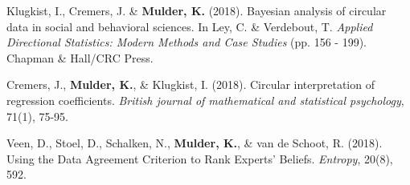 \documentclass[12pt, a4paper]{book}\usepackage[]{graphicx}\usepackage{xcolor}
\begin{document}
\vspace{.3cm}

\noindent Klugkist, I., Cremers, J. \& \textbf{Mulder, K.} (2018). Bayesian analysis of circular data in social and behavioral sciences. In Ley, C. \& Verdebout, T. \textit{Applied Directional Statistics: Modern Methods and Case Studies} (pp. 156 - 199). Chapman \& Hall/CRC Press.

\vspace{.3cm}

\noindent Cremers, J., \textbf{Mulder, K.}, \& Klugkist, I. (2018). Circular interpretation of regression coefficients. \textit{British journal of mathematical and statistical psychology}, 71(1), 75-95.

\vspace{.3cm}

\noindent Veen, D., Stoel, D., Schalken, N., \textbf{Mulder, K.}, \& van de Schoot, R. (2018). Using the Data Agreement Criterion to Rank Experts' Beliefs. \textit{Entropy}, 20(8), 592.




\end{document}
